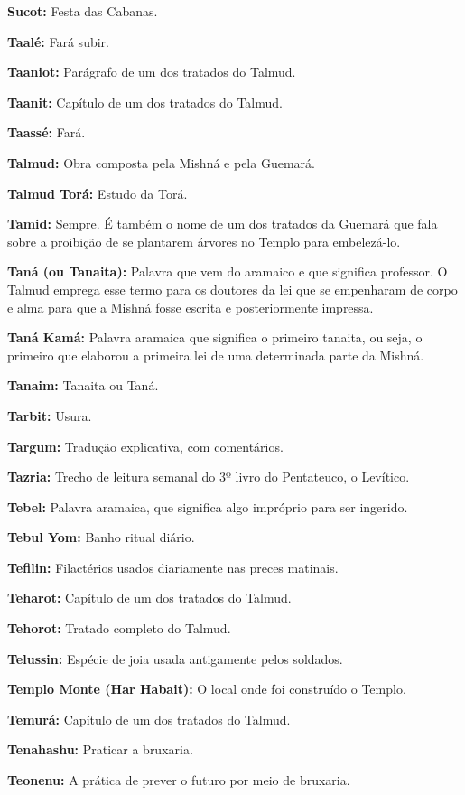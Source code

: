 \begin{hangparas}{.25in}{1}
{\textbf{Sucot:} Festa das Cabanas.

\textbf{Taalé:} Fará subir.

\textbf{Taaniot:} Parágrafo de um dos tratados do Talmud.

\textbf{Taanit:} Capítulo de um dos tratados do Talmud.

\textbf{Taassé:} Fará.

\textbf{Talmud:} Obra composta pela Mishná e pela Guemará.

\textbf{Talmud Torá:} Estudo da Torá.

\textbf{Tamid:} Sempre. É também o nome de um dos tratados da Guemará
que fala sobre a proibição de se plantarem árvores no Templo para
embelezá-lo.

\textbf{Taná (ou Tanaita):} Palavra que vem do aramaico e que significa
professor. O Talmud emprega esse termo para os doutores da lei que se
empenharam de corpo e alma para que a Mishná fosse escrita e
posteriormente impressa.

\textbf{Taná Kamá:} Palavra aramaica que significa o primeiro tanaita,
ou seja, o primeiro que elaborou a primeira lei de uma determinada
parte da Mishná.

\textbf{Tanaim:} Tanaita ou Taná.

\textbf{Tarbit:} Usura.

\textbf{Targum:} Tradução explicativa, com comentários.

\textbf{Tazria:} Trecho de leitura semanal do 3º livro do Pentateuco, o Levítico.

\textbf{Tebel:} Palavra aramaica, que significa algo
impróprio para ser ingerido.

\textbf{Tebul Yom:} Banho ritual diário.

\textbf{Tefilin:} Filactérios usados diariamente nas preces matinais.

\textbf{Teharot:} Capítulo de um dos tratados do Talmud.

\textbf{Tehorot:} Tratado completo do Talmud.

\textbf{Telussin:} Espécie de joia usada antigamente pelos soldados.

\textbf{Templo Monte (Har Habait):} O local onde foi construído o Templo.

\textbf{Temurá:} Capítulo de um dos tratados do Talmud.

\textbf{Tenahashu:} Praticar a bruxaria.

\textbf{Teonenu:} A prática de prever o futuro por meio de bruxaria.

}
\end{hangparas}
